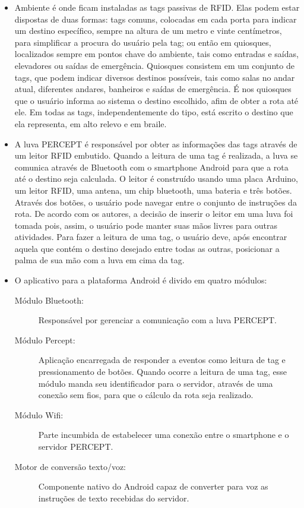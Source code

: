 \documentclass[english,brazilian]{UNISINOSmonografia}
\begin{document}
\begin{itemize}
	\item Ambiente é onde ficam instaladas as tags passivas de RFID. Elas podem estar dispostas de duas formas: tags comuns, colocadas em cada porta para indicar um destino específico, sempre na altura de um metro e vinte centímetros, para simplificar a procura do usuário pela tag; ou então em quiosques, localizados sempre em pontos chave do ambiente, tais como entradas e saídas, elevadores ou saídas de emergência. Quiosques consistem em um conjunto de tags, que podem indicar diversos destinos possíveis, tais como salas no andar atual, diferentes andares, banheiros e saídas de emergência. É nos quiosques que o usuário informa ao sistema o destino escolhido, afim de obter a rota até ele. Em todas as tags, independentemente do tipo, está escrito o destino que ela representa, em alto relevo e em braile.
	
	\item A luva PERCEPT é responsável por obter as informações das tags através de um leitor RFID embutido. Quando a leitura de uma tag é realizada, a luva se comunica através de Bluetooth com o smartphone Android para que a rota até o destino seja calculada. O leitor é construído usando uma placa Arduino, um leitor RFID, uma antena, um chip bluetooth, uma bateria e três botões. Através dos botões, o usuário pode navegar entre o conjunto de instruções da rota. De acordo com os autores, a decisão de inserir o leitor em uma luva foi tomada pois, assim, o usuário pode manter suas mãos livres para outras atividades. Para fazer a leitura de uma tag, o usuário deve, após encontrar aquela que contém o destino desejado entre todas as outras, posicionar a palma de sua mão com a luva em cima da tag.

	\item O aplicativo para a plataforma Android é divido em quatro módulos:
	\begin{description}
		\item[Módulo Bluetooth:] Responsável por gerenciar a comunicação com a luva PERCEPT.
		\item[Módulo Percept:] Aplicação encarregada de responder a eventos como leitura de tag e pressionamento de botões. Quando ocorre a leitura de uma tag, esse módulo manda seu identificador para o servidor, através de uma conexão sem fios, para que o cálculo da rota seja realizado.
		\item [Módulo Wifi:] Parte incumbida de estabelecer uma conexão entre o smartphone e o servidor PERCEPT.
		\item [Motor de conversão texto/voz:] Componente nativo do Android capaz de converter para voz as instruções de texto recebidas do servidor.
	\end{description}


\end{itemize}
\end{document}
